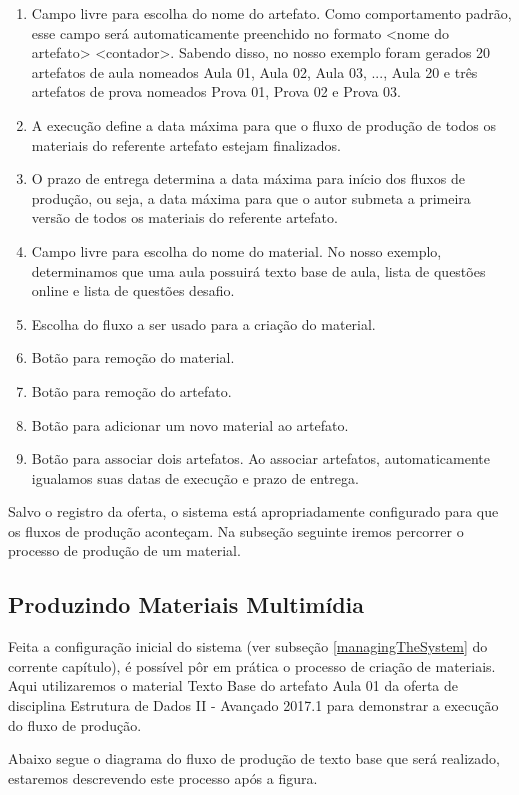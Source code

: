 \begin{enumerate}
	\item Campo livre para escolha do nome do artefato. Como comportamento padrão, esse campo será automaticamente preenchido no formato <nome do artefato> <contador>. Sabendo disso, no nosso exemplo foram gerados 20 artefatos de aula nomeados Aula 01, Aula 02, Aula 03, ..., Aula 20 e três artefatos de prova nomeados Prova 01, Prova 02 e Prova 03.
	\item A execução define a data máxima para que o fluxo de produção de todos os materiais do referente artefato estejam finalizados.
	\item O prazo de entrega determina a data máxima para início dos fluxos de produção, ou seja, a data máxima para que o autor submeta a primeira versão de todos os materiais do referente artefato.
	\item Campo livre para escolha do nome do material. No nosso exemplo, determinamos que uma aula possuirá texto base de aula, lista de questões online e lista de questões desafio.
	\item Escolha do fluxo a ser usado para a criação do material.
	\item Botão para remoção do material.
	\item Botão para remoção do artefato.
	\item Botão para adicionar um novo material ao artefato.
	\item Botão para associar dois artefatos. Ao associar artefatos, automaticamente igualamos suas datas de execução e prazo de entrega.
\end{enumerate}

Salvo o registro da oferta, o sistema está apropriadamente configurado para que os fluxos de produção aconteçam. Na subseção seguinte iremos percorrer o processo de produção de um material.

\subsection{Produzindo Materiais Multimídia}

Feita a configuração inicial do sistema (ver subseção \hyperref[managingTheSystem]{\ref{managingTheSystem}} do corrente capítulo), é possível pôr em prática o processo de criação de materiais. Aqui utilizaremos o material Texto Base do artefato Aula 01 da oferta de disciplina Estrutura de Dados II - Avançado 2017.1 para demonstrar a execução do fluxo de produção.

Abaixo segue o diagrama do fluxo de produção de texto base que será realizado, estaremos descrevendo este processo após a figura.


